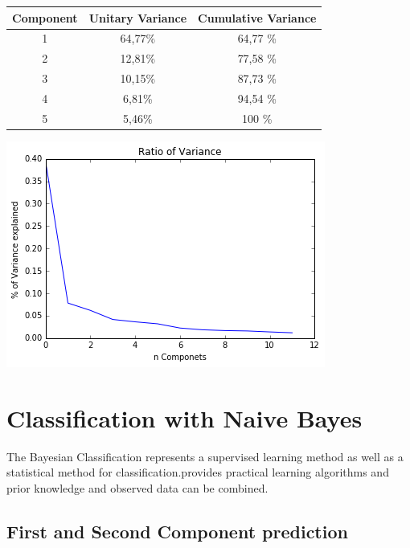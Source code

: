 \documentclass[11pt]{article}
\begin{document}
\begin{center}
 \begin{tabular}{||c c c||}
  \hline
  Component & Unitary Variance & Cumulative Variance \\ [0.5ex]
  \hline\hline
  1         & 64,77\%          & 64,77 \%            \\
  \hline
  2         & 12,81\%          & 77,58 \%            \\
  \hline
  3         & 10,15\%          & 87,73 \%            \\
  \hline
  4         & 6,81\%           & 94,54 \%            \\
  \hline
  5         & 5,46\%           & 100 \%              \\ [1ex]
  \hline
 \end{tabular}
\end{center}

\begin{center}
 \includegraphics[scale=0.5]{var}
\end{center}

\section{Classification with Naive Bayes}

The Bayesian Classification represents a supervised learning method as well as a statistical method for classification.provides practical learning algorithms and prior knowledge and observed data can be combined.

\subsection{First and Second Component prediction}
\end{document}
